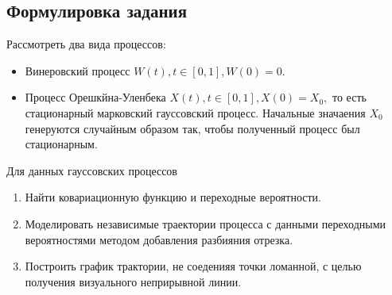 \documentclass[11pt]{article}
\numberwithin{equation}{section}
\begin{document}
\subsection{Формулировка задания}
Рассмотреть два вида процессов:
\begin{itemize}
  \item Винеровский процесс $W(t), t \in [0,1], W(0) =0.$
  \item Процесс Орешкйна-Уленбека $X(t), t \in [0,1], X(0) = X_0,$
  то есть стационарный марковский гауссовский процесс. Начальные значаения $X_0$ генеруются случайным образом так, 
  чтобы полученный процесс был стационарным.
\end{itemize}
Для данных гауссовских процессов 
\begin{enumerate}
  \item Найти ковариационную функцию и переходные вероятности.
  \item Моделировать независимые траектории процесса с данными переходными вероятностями методом добавления разбияния отрезка.
  \item Построить график трактории, не соеденияя точки ломанной, с целью получения визуального неприрывной линии.
\end{enumerate}
\end{document}
